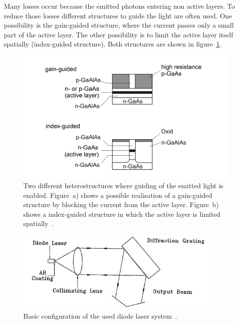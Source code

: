 Many losses occur because the emitted photons entering non active layers.
To reduce those losses different structures to guide the light are often used.
One possibility is the gain-guided structure, where the current passes only a
small part of the active layer. The other possibility is to limit
the active layer itself spatially (index-guided structure). Both structures are
shown in figure~\ref{fig:guided}.
\begin{figure}
  \centering
  \includegraphics[width = \textwidth]{Pics/guided.png}
  \caption{Two different heterostructures where guiding of the emitted light is
  enabled. Figure~a) shows a possible realisation of a gain-guided structure by blocking
  the current from the active layer. Figure~b) shows a index-guided structure in
  which the active layer is limited spatially~\cite{Eichler}.}
  \label{fig:guided}
\end{figure}
\begin{figure}
  \centering
  \includegraphics[width = 0.9\textwidth]{Pics/setup.png}
  \caption{Basic configuration of the used diode laser system~\cite{anleitung}.}
  \label{fig:setup}
\end{figure}

